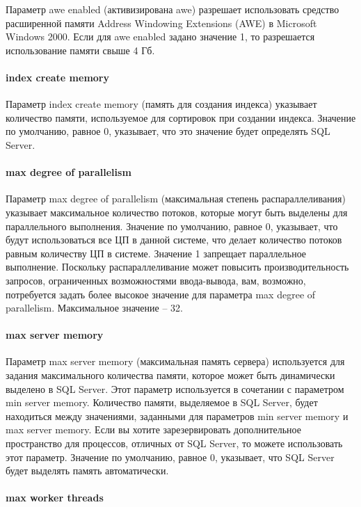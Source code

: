 \documentclass[russian,utf8,emptystyle]{eskdtext}
\begin{document}
Параметр awe enabled (активизирована awe) разрешает использовать средство расширенной памяти Address Windowing Extensions (AWE) в Microsoft Windows 2000. Если для awe enabled задано значение 1, то разрешается использование памяти свыше 4 Гб.

\paragraph{index create memory}

Параметр index create memory (память для создания индекса) указывает количество памяти, используемое для сортировок при создании индекса. Значение по умолчанию, равное 0, указывает, что это значение будет определять SQL Server.

\paragraph{max degree of parallelism}

Параметр max degree of parallelism (максимальная степень распараллеливания) указывает максимальное количество потоков, которые могут быть выделены для параллельного выполнения. Значение по умолчанию, равное 0, указывает, что будут использоваться все ЦП в данной системе, что делает количество потоков равным количеству ЦП в системе. Значение 1 запрещает параллельное выполнение. Поскольку распараллеливание может повысить производительность запросов, ограниченных возможностями ввода-вывода, вам, возможно, потребуется задать более высокое значение для параметра max degree of parallelism. Максимальное значение – 32.

\paragraph{max server memory}

Параметр max server memory (максимальная память сервера) используется для задания максимального количества памяти, которое может быть динамически выделено в SQL Server. Этот параметр используется в сочетании с параметром min server memory. Количество памяти, выделяемое в SQL Server, будет находиться между значениями, заданными для параметров min server memory и max server memory. Если вы хотите зарезервировать дополнительное пространство для процессов, отличных от SQL Server, то можете использовать этот параметр. Значение по умолчанию, равное 0, указывает, что SQL Server будет выделять память автоматически.

\paragraph{max worker threads}
\end{document}
